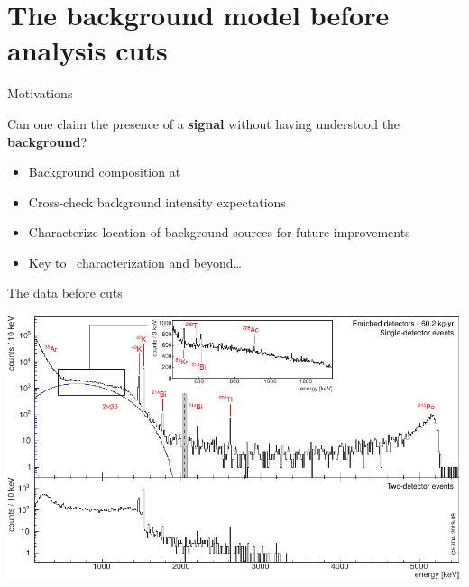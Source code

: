 \documentclass[10pt,aspectratio=169]{beamer}
\begin{document}
\section{The background model before analysis cuts}
\begin{frame}{Motivations}
  \begin{simpleblock}
    Can one claim the presence of a \textbf{signal} without having understood the \textbf{background}?
  \end{simpleblock}
  \begin{itemize}
    \item Background composition at \alert{\qbb}
    \item Cross-check background \alert{intensity expectations}
    \item Characterize \alert{location} of background sources for future improvements
    \item Key to \nnbb\ characterization and beyond\ldots
  \end{itemize}
\end{frame}
\begin{frame}[plain]{The data before cuts}
  \begin{center}
    \includegraphics[height=0.95\textheight]{plots/bkg/raw/ph2/dataGe-desc.pdf}
  \end{center}
\end{frame}
\end{document}
